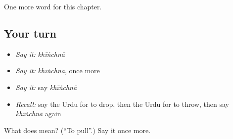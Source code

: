 \begin{grammarlens}[title={What you've built}]
One more word for this chapter.
\end{grammarlens}

\subsection*{Your turn}
\begin{itemize}
\raggedright
  \item \emph{Say it:} \emph{khīṅchnā}
  \item \emph{Say it:} \emph{khīṅchnā}, once more
  \item \emph{Say it:} say \emph{khīṅchnā}
  \item \emph{Recall:} say the Urdu for to drop, then the Urdu for to throw, then say \emph{khīṅchnā} again
\end{itemize}

\begin{tcolorbox}[breakable,colback=teal!4,colframe=teal!35!black,title={Before you move on}]
What does  mean? (\textquotedblleft{}To pull\textquotedblright{}.) Say it once more.
\end{tcolorbox}
